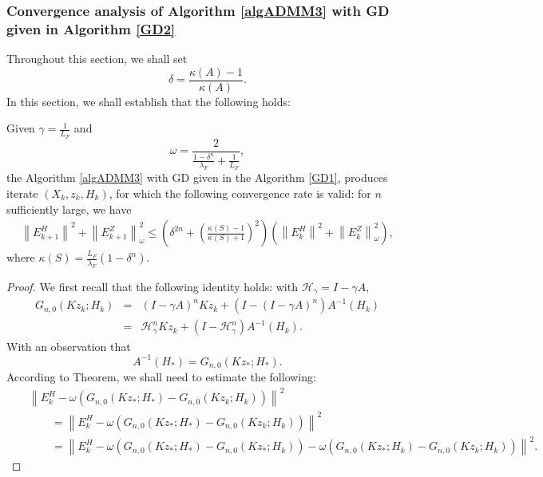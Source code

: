 \begin{itemize}
\subsubsection{Convergence analysis of Algorithm \ref{algADMM3} with GD given in Algorithm \ref{GD2}}
Throughout this section, we shall set 
\begin{equation}
\delta = \frac{\kappa(A)-1}{\kappa(A)}. 
\end{equation} 
In this section, we shall establish that the following holds: 
\begin{theorem}\label{main:theorem04} 
Given $\gamma = \frac{1}{L_F}$ and \begin{equation}
\omega = \frac{2}{\frac{1 - \delta^n}{\lambda_F} + \frac{1}{L_F}}, 
\end{equation}
the Algorithm \ref{algADMM3} with GD given in the Algorithm \ref{GD1}, produces iterate $(X_k, z_k, H_k)$, for which the following convergence rate is valid: for $n$ sufficiently large, we have 
\begin{eqnarray*}
\left \|E_{k+1}^H \right \|^2 + \left \|E_{k+1}^Z \right \|_\omega^2 \leq \left ( \delta^{2n}   + \left ( \frac{\kappa(S) - 1}{\kappa(S) + 1} \right )^2 \right ) \left (\left \|E_{k}^H \right \|^2 + \left \|E_{k}^Z \right \|_\omega^2 \right ), 
\end{eqnarray*}
where $\kappa(S) = \frac{L_F}{\lambda_F}(1 - \delta^n).$ 
\end{theorem}
\begin{proof} 
We first recall that the following identity holds: with $\mathcal{H}_\gamma = I - \gamma A$, 
\begin{eqnarray*}
G_{n,0}(Kz_k;H_k) &=& (I - \gamma A)^n Kz_k + (I - (I - \gamma A)^n) A^{-1}(H_k) \\
&=& \mathcal{H}_\gamma^n Kz_k + (I - \mathcal{H}_\gamma^n) A^{-1}(H_k). 
\end{eqnarray*} 
With an observation that 
\begin{equation}
A^{-1}(H_*) = G_{n,0}(Kz_*;H_*).  
\end{equation}
According to Theorem, we shall need to estimate the following: 
\begin{eqnarray*}
&& \left \|E_k^H - \omega (G_{n,0}(Kz_*; H_*) - G_{n,0} (Kz_k;H_k)) \right \|^2 \\
&& \qquad =  \left \|E_k^H - \omega (G_{n,0}(Kz_*;H_*) - G_{n,0}(Kz_k;H_k)) \right \|^2 \\
&& \qquad = \left \|E_k^H - \omega (G_{n,0}(Kz_*;H_*) - G_{n,0}(Kz_*;H_k)) - \omega ( G_{n,0}(Kz_*;H_k) - G_{n,0}(Kz_k;H_k)) \right \|^2. 

\end{eqnarray*}
\end{proof}
\end{itemize}
